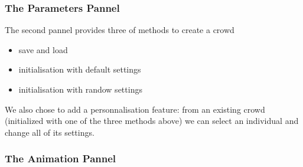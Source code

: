 \subsubsection{The Parameters Pannel}
The second pannel provides three of methods to create a crowd 
\begin{itemize}
\item save and load
\item initialisation with default settings
  \item initialisation with randow settings
\end{itemize}

We also chose to add a personnalisation feature: from an existing crowd (initialized with one of the three methods above) we can select an individual and change all of its settings.


\subsubsection{The Animation Pannel}
